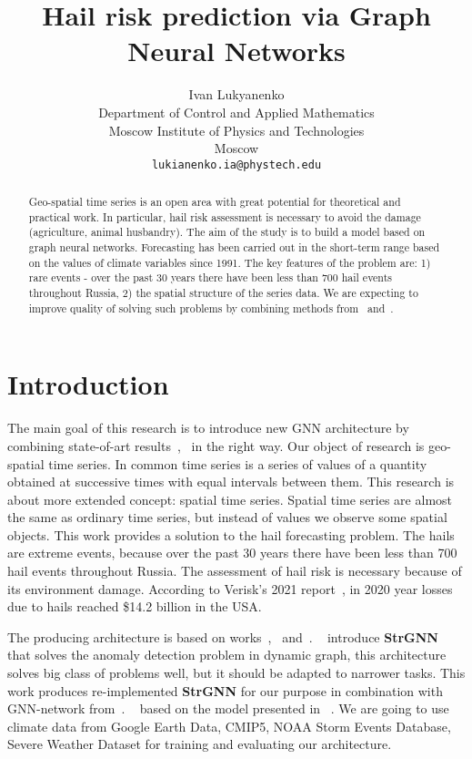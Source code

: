 \documentclass{article}
\title{Hail risk prediction via Graph Neural Networks}
\author{ Ivan Lukyanenko \\
	Department of Control and Applied Mathematics\\
	Moscow Institute of Physics and Technologies\\
	Moscow \\
	\texttt{lukianenko.ia@phystech.edu} \\
}
\date{}
\begin{document}
\fontsize{12}{12pt}\selectfont
\maketitle

\begin{abstract}
	Geo-spatial time series is an open area with great potential for theoretical and practical work. In particular, hail risk assessment is necessary to avoid the damage (agriculture, animal husbandry). The aim of the study is to build a  model based on graph neural networks. Forecasting has been carried out in the short-term range based on the values of climate variables since 1991. The key features of the problem are: 1) rare events - over the past 30 years there have been less than 700 hail events throughout Russia, 2) the spatial structure of the series data. We are expecting to improve quality of solving such problems by combining methods from~\cite{DBLP:journals/corr/abs-2012-01598} and~\cite{DBLP:journals/corr/abs-2005-07427}.
\end{abstract}



\section{Introduction}
The main goal of this research is to introduce new GNN architecture by combining state-of-art results~\cite{DBLP:journals/corr/abs-2012-01598},~\cite{DBLP:journals/corr/abs-2005-07427} in the right way. Our object of research is geo-spatial time series. In common time series is a series of values of a quantity obtained at successive times with equal intervals between them. This research is about more extended concept: spatial time series. Spatial time series are almost the same as ordinary time series, but instead of values we observe some spatial objects. This work provides a solution to the hail forecasting problem. The hails are extreme events, because over the past 30 years there have been less than 700 hail events throughout Russia. The assessment of hail risk is necessary because of its environment damage. According to Verisk’s 2021 report~\cite{haillosses}, in 2020 year losses due to hails reached \$14.2 billion in the USA.

The producing architecture is based on works~\cite{DBLP:journals/corr/abs-2012-01598},~\cite{wu2020connecting} and~\cite{DBLP:journals/corr/abs-2005-07427}. ~\cite{DBLP:journals/corr/abs-2005-07427} introduce \textbf{StrGNN} that solves the anomaly detection problem in dynamic graph, this architecture solves big class of problems well, but it should be adapted to narrower tasks. This work produces re-implemented \textbf{StrGNN} for our purpose in combination with GNN-network from~\cite{DBLP:journals/corr/abs-2012-01598}. ~\cite{DBLP:journals/corr/abs-2012-01598} based on the model presented in ~\cite{wu2020connecting}. We are going to use climate data from Google Earth Data, CMIP5, NOAA Storm Events Database, Severe Weather Dataset for training and evaluating our architecture.
\end{document}
